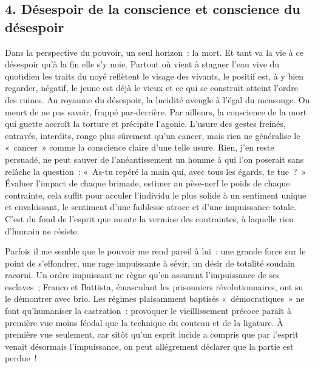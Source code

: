 \documentclass[french,twoside]{book} %
\begin{document}
\subsection[{4. Désespoir de la conscience et conscience du désespoir}]{\textsc{4.} Désespoir de la conscience et conscience du désespoir}
\noindent Dans la perspective du pouvoir, un seul horizon : la mort. Et tant va la vie à ce désespoir qu’à la fin elle s’y noie. Partout où vient à stagner l’eau vive du quotidien les traits du noyé reflètent le visage des vivants, le positif est, à y bien regarder, négatif, le jeune est déjà le vieux et ce qui se construit atteint l’ordre des ruines. Au royaume du désespoir, la lucidité aveugle à l’égal du mensonge. On meurt de ne pas savoir, frappé par-derrière. Par ailleurs, la conscience de la mort qui guette accroît la torture et précipite l’agonie. L’usure des gestes freinés, entravés, interdits, ronge plus sûrement qu’un cancer, mais rien ne généralise le « cancer » comme la conscience claire d’une telle usure. Rien, j’en reste persuadé, ne peut sauver de l’anéantissement un homme à qui l’on poserait sans relâche la question : « As-tu repéré la main qui, avec tous les égards, te tue ? » Évaluer l’impact de chaque brimade, estimer au pèse-nerf le poids de chaque contrainte, cela suffit pour acculer l’individu le plus solide à un sentiment unique et envahissant, le sentiment d’une faiblesse atroce et d’une impuissance totale. C’est du fond de l’esprit que monte la vermine des contraintes, à laquelle rien d’humain ne résiste.\par
Parfois il me semble que le pouvoir me rend pareil à lui : une grande force sur le point de s’effondrer, une rage impuissante à sévir, un désir de totalité soudain racorni. Un ordre impuissant ne règne qu’en assurant l’impuissance de ses esclaves ; Franco et Battista, émasculant les prisonniers révolutionnaires, ont su le démontrer avec brio. Les régimes plaisamment baptisés « démocratiques » ne font qu’humaniser la castration : provoquer le vieillissement précoce paraît à première vue moins féodal que la technique du couteau et de la ligature. À première vue seulement, car sitôt qu’un esprit lucide a compris que par l’esprit venait désormais l’impuissance, on peut allégrement déclarer que la partie est perdue !\par
\end{document}
